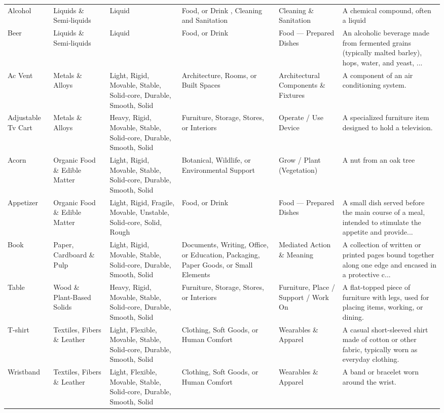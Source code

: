 \begin{table}[t]
\begin{tabular}{p{2cm}p{2.5cm}p{2.5cm}p{2.5cm}p{2.5cm}p{4cm}}
Alcohol & Liquids \& Semi‑liquids & Liquid & Food, or Drink , Cleaning and Sanitation & Cleaning \& Sanitation & A chemical compound, often a liquid \\
Beer & Liquids \& Semi‑liquids & Liquid & Food, or Drink  & Food — Prepared Dishes & An alcoholic beverage made from fermented grains (typically malted barley), hops, water, and yeast, ... \\
Ac Vent & Metals \& Alloys & Light, Rigid, Movable, Stable, Solid-core, Durable, Smooth, Solid & Architecture, Rooms, or Built Spaces & Architectural Components \& Fixtures & A component of an air conditioning system. \\
Adjustable Tv Cart & Metals \& Alloys & Heavy, Rigid, Movable, Stable, Solid-core, Durable, Smooth, Solid & Furniture, Storage, Stores, or Interiors & Operate / Use Device & A specialized furniture item designed to hold a television. \\
Acorn & Organic Food \& Edible Matter & Light, Rigid, Movable, Stable, Solid-core, Durable, Smooth, Solid & Botanical, Wildlife, or Environmental Support & Grow / Plant (Vegetation) & A nut from an oak tree \\
Appetizer & Organic Food \& Edible Matter & Light, Rigid, Fragile, Movable, Unstable, Solid-core, Solid, Rough & Food, or Drink  & Food — Prepared Dishes & A small dish served before the main course of a meal, intended to stimulate the appetite and provide... \\
Book & Paper, Cardboard \& Pulp & Light, Rigid, Movable, Stable, Solid-core, Durable, Smooth, Solid & Documents, Writing, Office, or Education, Packaging, Paper Goods, or Small Elements & Mediated Action \& Meaning & A collection of written or printed pages bound together along one edge and encased in a protective c... \\
Table & Wood \& Plant‑Based Solids & Heavy, Rigid, Movable, Stable, Solid-core, Durable, Smooth, Solid & Furniture, Storage, Stores, or Interiors & Furniture, Place / Support / Work On & A flat-topped piece of furniture with legs, used for placing items, working, or dining. \\
T-shirt & Textiles, Fibers \& Leather & Light, Flexible, Movable, Stable, Solid-core, Durable, Smooth, Solid & Clothing, Soft Goods, or Human Comfort & Wearables \& Apparel & A casual short-sleeved shirt made of cotton or other fabric, typically worn as everyday clothing. \\
Wristband & Textiles, Fibers \& Leather & Light, Flexible, Movable, Stable, Solid-core, Durable, Smooth, Solid & Clothing, Soft Goods, or Human Comfort & Wearables \& Apparel & A band or bracelet worn around the wrist. \\

\end{tabular}
\end{table}
